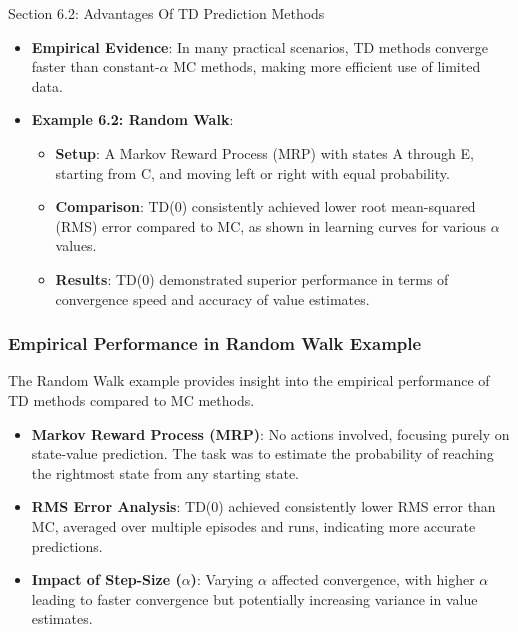 \begin{notes}{Section 6.2: Advantages Of TD Prediction Methods}
\begin{highlight}
        \begin{itemize}
            \item \textbf{Empirical Evidence}: In many practical scenarios, TD methods converge faster than constant-$\alpha$ MC methods, making more efficient use of limited data.
            \item \textbf{Example 6.2: Random Walk}:
                \begin{itemize}
                    \item \textbf{Setup}: A Markov Reward Process (MRP) with states A through E, starting from C, and moving left or right with equal probability.
                    \item \textbf{Comparison}: TD(0) consistently achieved lower root mean-squared (RMS) error compared to MC, as shown in learning curves for various $\alpha$ values.
                    \item \textbf{Results}: TD(0) demonstrated superior performance in terms of convergence speed and accuracy of value estimates.
                \end{itemize}
        \end{itemize}
    
    \end{highlight}
    
    \subsubsection*{Empirical Performance in Random Walk Example}
    
    The Random Walk example provides insight into the empirical performance of TD methods compared to MC methods.
    
    \begin{highlight}
    
        \begin{itemize}
            \item \textbf{Markov Reward Process (MRP)}: No actions involved, focusing purely on state-value prediction. The task was to estimate the probability of reaching the rightmost state from any 
            starting state.
            \item \textbf{RMS Error Analysis}: TD(0) achieved consistently lower RMS error than MC, averaged over multiple episodes and runs, indicating more accurate predictions.
            \item \textbf{Impact of Step-Size ($\alpha$)}: Varying $\alpha$ affected convergence, with higher $\alpha$ leading to faster convergence but potentially increasing variance in value 
            estimates.
        \end{itemize}
    

\end{highlight}
\end{notes}
